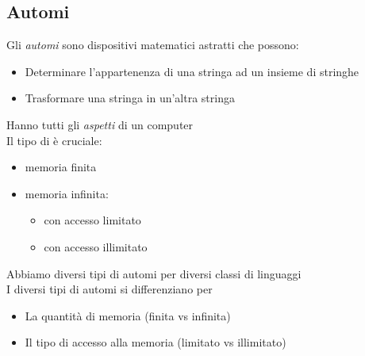 \subsection{Automi}
Gli \textit{automi} sono dispositivi matematici astratti che possono:
\begin{itemize}
	\item Determinare l'appartenenza di una stringa ad un insieme di stringhe
	\item Trasformare una stringa in un'altra stringa
\end{itemize}
Hanno tutti gli \textit{aspetti} di un computer\\
Il tipo di  è cruciale:
\begin{itemize}
	\item memoria finita
	\item memoria infinita:
		\begin{itemize}
			\item con accesso limitato
			\item con accesso illimitato
		\end{itemize}
\end{itemize}
Abbiamo diversi tipi di automi per diversi classi di linguaggi\\
I diversi tipi di automi si differenziano per
\begin{itemize}
	\item La quantità di memoria (finita vs infinita)
	\item Il tipo di accesso alla memoria (limitato vs illimitato)
\end{itemize}

